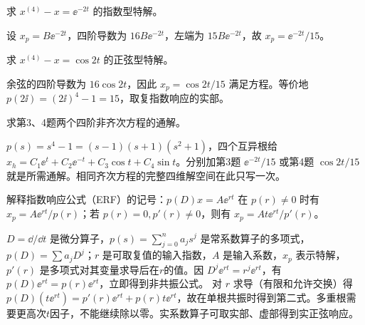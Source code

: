\begin{exercise}\label{cw:rec09-3}
求 $x^{(4)}-x=\ee^{-2t}$ 的指数型特解。
\end{exercise}
\begin{solution}
设 $x_p=B\ee^{-2t}$，四阶导数为 $16B\ee^{-2t}$，左端为 $15B\ee^{-2t}$，故 $x_p=\ee^{-2t}/15$。
\par{}
\end{solution}

\begin{exercise}\label{cw:rec09-4}
求 $x^{(4)}-x=\cos2t$ 的正弦型特解。
\end{exercise}
\begin{solution}
余弦的四阶导数为 $16\cos2t$，因此 $x_p=\cos2t/15$ 满足方程。等价地 $p(2\ii)=(2\ii)^4-1=15$，取复指数响应的实部。
\par{}
\end{solution}

\begin{exercise}\label{cw:rec09-5}
求第3、4题两个四阶非齐次方程的通解。
\end{exercise}
\begin{solution}
$p(s)=s^4-1=(s-1)(s+1)(s^2+1)$，四个互异根给 $x_h=C_1\ee^t+C_2\ee^{-t}+C_3\cos t+C_4\sin t$。分别加第3题 $\ee^{-2t}/15$ 或第4题 $\cos2t/15$ 就是所需通解。相同齐次方程的完整四维解空间在此只写一次。
\par{}
\end{solution}

\begin{exercise}\label{cw:rec10-1}
解释指数响应公式（ERF）的记号：$p(D)x=A\ee^{rt}$ 在 $p(r)\ne0$ 时有 $x_p=A\ee^{rt}/p(r)$；若 $p(r)=0,p'(r)\ne0$，则有 $x_p=At\ee^{rt}/p'(r)$。
\end{exercise}
\begin{solution}
$D=\dd/\dd t$ 是微分算子，$p(s)=\sum_{j=0}^na_js^j$ 是常系数算子的多项式，$p(D)=\sum a_jD^j$；$r$ 是可取复值的输入指数，$A$ 是输入系数，$x_p$ 表示特解，$p'(r)$ 是多项式对其变量求导后在$r$的值。因 $D^j\ee^{rt}=r^j\ee^{rt}$，有 $p(D)\ee^{rt}=p(r)\ee^{rt}$，立即得到非共振公式。
对 $r$ 求导（有限和允许交换）得 $p(D)(t\ee^{rt})=p'(r)\ee^{rt}+p(r)t\ee^{rt}$，故在单根共振时得到第二式。多重根需要更高次$t$因子，不能继续除以零。实系数算子可取实部、虚部得到实正弦响应。
\par{}
\end{solution}

